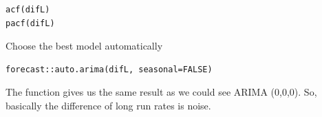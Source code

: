 \documentclass[12pt,a4paper]{article}
\begin{document}
\begin{verbatim}
acf(difL)
pacf(difL)
\end{verbatim}
\begin{center}
\end{center}
\begin{center}
\end{center}
Choose the best model automatically

\begin{verbatim}
forecast::auto.arima(difL, seasonal=FALSE)
\end{verbatim}
\begin{center}
\end{center}
The function gives us the same result as we could see ARIMA (0,0,0).
So, basically the difference of long run rates is noise.
\end{document}
